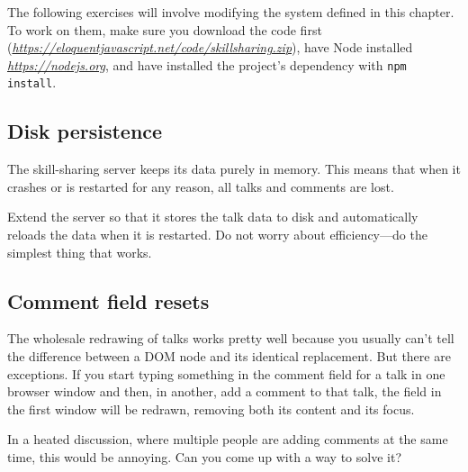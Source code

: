 The following exercises will involve modifying the system defined in this chapter. To work on them, make sure you download the code first (\href{https://eloquentjavascript.net/code/skillsharing.zip}{\emph{https://eloquentjavascript.net\slash code\slash skillsharing.zip}}), have Node installed \href{https://nodejs.org}{\emph{https://nodejs.org}}, and have installed the project's dependency with \lstinline`npm install`.

\subsection{Disk persistence}

The skill-sharing server keeps its data purely in memory. This means that when it crashes or is restarted for any reason, all talks and comments are lost.

Extend the server so that it stores the talk data to disk and automatically reloads the data when it is restarted. Do not worry about efficiency—do the simplest thing that works.

\subsection{Comment field resets}

The wholesale redrawing of talks works pretty well because you usually can't tell the difference between a DOM node and its identical replacement. But there are exceptions. If you start typing something in the comment field for a talk in one browser window and then, in another, add a comment to that talk, the field in the first window will be redrawn, removing both its content and its focus.

In a heated discussion, where multiple people are adding comments at the same time, this would be annoying. Can you come up with a way to solve it?
